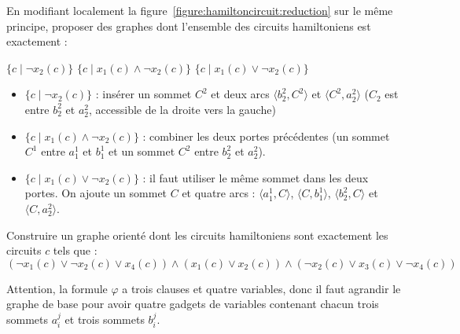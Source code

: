 \begin{exercice}[\textsc{Circuit Hamiltonien} est NP-complet%
    \footnote{Vidéo détaillée de la réduction de \textsc{3-SAT} à \textsc{Cycle Hamiltonien} : \url{https://www.youtube.com/watch?v=OHnX-R_SBpM}}]
  \ifcorrection{\newpage}
  \begin{question}
  \item En modifiant localement la figure~\ref{figure:hamiltoncircuit:reduction} sur le même principe,
    proposer des graphes dont l'ensemble des circuits hamiltoniens est exactement :
    \begin{center}
      $\{c \mid \lnot x_2(c)\}$ \quad\quad $\{c \mid x_1(c) \land \lnot x_2(c)\}$  \quad\quad $\{c \mid x_1(c) \lor \lnot x_2(c)\}$ 
    \end{center}
  \end{question}
  \begin{correction}
    \begin{itemize}
    \item $\{ c \mid \lnot x_2(c) \}$ : insérer un sommet $C^2$ et deux arcs $\langle b_2^2, C^2\rangle$ et $\langle C^2, a_2^2 \rangle$
      ($C_2$ est entre $b_2^2$ et $a_2^2$, accessible de la droite vers la gauche)
    \item $\{ c \mid x_1(c) \land \lnot x_2(c) \}$ : combiner les deux portes précédentes
      (un sommet $C^1$ entre $a_1^1$ et $b_1^1$ et un sommet $C^2$ entre $b_2^2$ et $a_2^2$). 
    \item $\{ c \mid x_1(c) \lor \lnot x_2(c) \}$ : il faut utiliser le même sommet dans les deux portes.
      On ajoute un sommet $C$ et quatre arcs : $\langle a_1^1, C\rangle$, $\langle C, b_1^1 \rangle$, $\langle b_2^2, C\rangle$ et $\langle C, a_2^2 \rangle$.
    \end{itemize}
  \end{correction}
  
  \begin{question}
  \item Construire un graphe orienté dont les circuits hamiltoniens sont exactement les circuits $c$ tels que :
    $$(\lnot x_1(c) \lor \lnot x_2(c) \lor x_4(c)) \land (x_1(c) \lor x_2(c)) \land (\lnot x_2(c) \lor x_3(c) \lor \lnot x_4(c))$$
  \end{question}
  \begin{correction}
    Attention, la formule $\varphi$ a trois clauses et quatre variables, donc il faut agrandir le graphe de base pour avoir
    quatre gadgets de variables contenant chacun trois sommets $a_i^j$ et trois sommets $b_i^j$. 

    \vspace{-2mm}
    \begin{center}
\end{center}
\end{correction}
\end{exercice}
